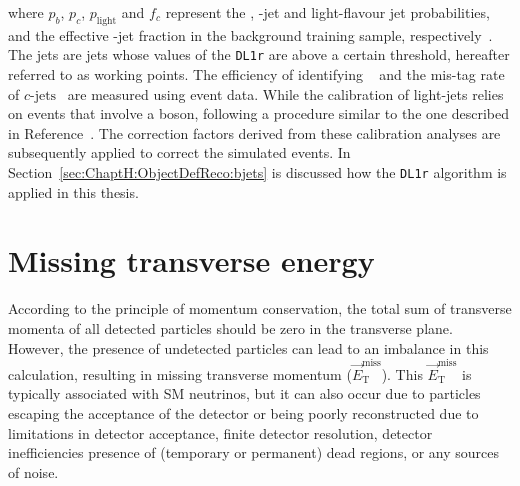 where $p_{b}$, $p_{c}$, $p_{\text{light}}$ and $f_{c}$ represent the \bjet,
\Pcharm-jet and light-flavour jet probabilities, and
the effective \Pcharm-jet fraction in the background training sample, respectively~\cite{ATLAS:2022qxm}. 
The \btagged jets are jets whose values of the \texttt{DL1r} are above a certain threshold, hereafter referred to as working points. 
The efficiency of identifying \bjets~\cite{FTAG-2018-01} and the mis-tag rate of 
\ensuremath{c\text{-jets}}~\cite{ATLAS-CONF-2018-001} are measured using \ttbar event data. 
While the calibration of light-jets relies on events that involve a \PZ boson, 
following a procedure similar to the one described in Reference~\cite{ATLAS-CONF-2018-006}. 
The correction factors derived from these calibration analyses are subsequently applied to correct 
the simulated events. 
In Section~\ref{sec:ChaptH:ObjectDefReco:bjets} is discussed how the \texttt{DL1r} algorithm
is applied in this thesis.





\section{Missing transverse energy}
\label{sec:Chap3:Reco:MET}
According to the principle of momentum conservation, the total sum of transverse 
momenta of all detected particles should be zero in the transverse plane. However, 
the presence of undetected particles can lead to an imbalance in this calculation, 
resulting in missing transverse momentum ($\overrightarrow{E}_{\text{T}}^{\text{miss}}$). 
This $\overrightarrow{E}_{\text{T}}^{\text{miss}}$ is typically associated with SM neutrinos, but it can also occur due 
to particles escaping the acceptance of the detector or being poorly reconstructed due to limitations in 
detector acceptance, finite detector resolution, detector inefficiencies presence of 
(temporary or permanent) dead regions, or any sources of noise.


